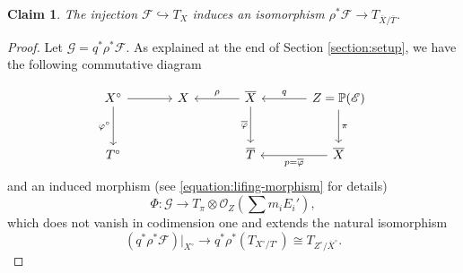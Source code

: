 \documentclass[english,reqno]{amsart}
\newcommand\bbP{{\mathbb P}}
\newcommand\sE{{\mathscr E}}
\newcommand\sF{{\mathscr F}}
\newcommand\sG{{\mathscr G}}
\newcommand\sO{{\mathscr O}}
\theoremstyle{plain}
\newtheorem{claim}[thm]{Claim}
\theoremstyle{definition}
\numberwithin{equation}{section} %
\begin{document}
\begin{claim}\label{claim:pullback-sheaf-in-tangent-1}
	The injection $\sF \hookrightarrow T_X$ induces an isomorphism   $\rho^*\sF \to T_{\overline{X}/\overline{T}}$.
\end{claim}




\begin{proof}
	Let $\sG=q^*\rho^*\sF$. As explained at the end of Section \ref{section:setup}, we have the following commutative diagram
	
	\[\begin{tikzcd}[column sep=large, row sep=large]
	X^\circ \dar[swap]{\varphi^\circ}\rar &
	X & \overline{X} \lar[swap]{\rho} \dar[swap]{\overline{\varphi}} &
	Z=\bbP(\sE)\lar[swap]{q}\dar{\pi} \\
	T^\circ & &
	\overline{T} &
	\overline{X}\lar{p=\overline{\varphi}}
	\end{tikzcd}
	\]
	and an induced morphism (see \eqref{equation:lifing-morphism} for details)
	$$   
	\Phi\colon \sG \to T_{\pi}\otimes \sO_{Z}(\sum m_iE_i'),
	$$
	which does not vanish in codimension one and extends the natural isomorphism 
	\[
	(q^*\rho^*\sF)\vert_{X^\circ}\rightarrow q^*\rho^*(T_{X^\circ/T^\circ})\cong T_{Z^\circ/\overline{X}^\circ}.
	\]
	\smallskip
	

\end{proof}
\end{document}
